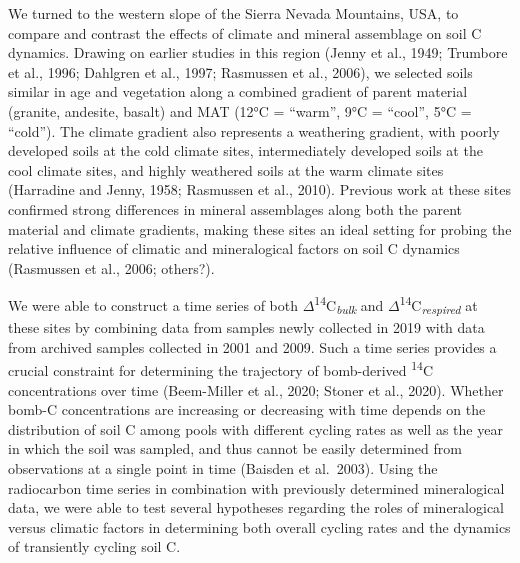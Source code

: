 \documentclass[english,man,floatsintext]{apa6}
\begin{document}
We turned to the western slope of the Sierra Nevada Mountains, USA, to compare and contrast the effects of climate and mineral assemblage on soil C dynamics. Drawing on earlier studies in this region (Jenny et al., 1949; Trumbore et al., 1996; Dahlgren et al., 1997; Rasmussen et al., 2006), we selected soils similar in age and vegetation along a combined gradient of parent material (granite, andesite, basalt) and MAT (12°C = \enquote{warm}, 9°C = \enquote{cool}, 5°C = \enquote{cold}). The climate gradient also represents a weathering gradient, with poorly developed soils at the cold climate sites, intermediately developed soils at the cool climate sites, and highly weathered soils at the warm climate sites (Harradine and Jenny, 1958; Rasmussen et al., 2010). Previous work at these sites confirmed strong differences in mineral assemblages along both the parent material and climate gradients, making these sites an ideal setting for probing the relative influence of climatic and mineralogical factors on soil C dynamics (Rasmussen et al., 2006; others?).

We were able to construct a time series of both \(\Delta\)\textsuperscript{14}C\textsubscript{\emph{bulk}} and \(\Delta\)\textsuperscript{14}C\textsubscript{\emph{respired}} at these sites by combining data from samples newly collected in 2019 with data from archived samples collected in 2001 and 2009. Such a time series provides a crucial constraint for determining the trajectory of bomb-derived \textsuperscript{14}C concentrations over time (Beem-Miller et al., 2020; Stoner et al., 2020). Whether bomb-C concentrations are increasing or decreasing with time depends on the distribution of soil C among pools with different cycling rates as well as the year in which the soil was sampled, and thus cannot be easily determined from observations at a single point in time (Baisden et al.~2003). Using the radiocarbon time series in combination with previously determined mineralogical data, we were able to test several hypotheses regarding the roles of mineralogical versus climatic factors in determining both overall cycling rates and the dynamics of transiently cycling soil C.
\end{document}
